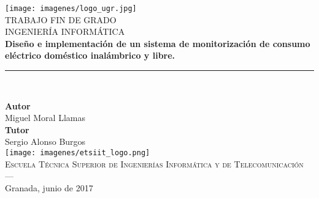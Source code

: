 \begin{titlepage}
 
 
\newlength{\centeroffset}
\setlength{\centeroffset}{-0.5\oddsidemargin}
\addtolength{\centeroffset}{0.5\evensidemargin}
\thispagestyle{empty}

\noindent\hspace*{\centeroffset}\begin{minipage}{\textwidth}

\centering
\texttt{[image: imagenes/logo\_ugr.jpg]}\\[1.4cm]

\textsc{ \Large TRABAJO FIN DE GRADO\\[0.2cm]}
\textsc{ INGENIERÍA INFORMÁTICA}\\[1cm]
% 
{\bfseries \LARGE Diseño e implementación de un sistema de monitorización de consumo eléctrico doméstico inalámbrico y libre.\\
}
\noindent\rule[-1ex]{\textwidth}{3pt}\\[3.5ex]
{\large\bfseries}
\end{minipage}

\vspace{2.5cm}
\noindent\hspace*{\centeroffset}\begin{minipage}{\textwidth}
\centering

\textbf{Autor}\\ {Miguel Moral Llamas}\\[2.5ex]
\textbf{Tutor}\\
{Sergio Alonso Burgos
}\\[2cm]
\texttt{[image: imagenes/etsiit\_logo.png]}\\[0.1cm]
\textsc{Escuela Técnica Superior de Ingenierías Informática y de Telecomunicación}\\
\textsc{---}\\
Granada, junio de 2017
\end{minipage}
\end{titlepage}


